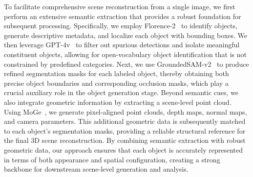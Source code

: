 %
To facilitate comprehensive scene reconstruction from a single image, we first perform an extensive semantic extraction that provides a robust foundation for subsequent processing. Specifically, we employ Florence-2~\cite{xiao2024florence} to identify objects, generate descriptive metadata, and localize each object with bounding boxes. We then leverage GPT-4v~\cite{achiam2023gpt} to filter out spurious detections and isolate meaningful constituent objects, allowing for open-vocabulary object identification that is not constrained by predefined categories. Next, we use GroundedSAM-v2~\cite{TODO} to produce refined segmentation masks for each labeled object, thereby obtaining both precise object boundaries and corresponding occlusion masks, which play a crucial auxiliary role in the object generation stage.
%
Beyond semantic cues, we also integrate geometric information by extracting a scene-level point cloud. Using MoGe~\cite{TODO}, we generate pixel-aligned point clouds, depth maps, normal maps, and camera parameters. This additional geometric data is subsequently matched to each object’s segmentation masks, providing a reliable structural reference for the final 3D scene reconstruction.
%
By combining semantic extraction with robust geometric data, our approach ensures that each object is accurately represented in terms of both appearance and spatial configuration, creating a strong backbone for downstream scene-level generation and analysis.

